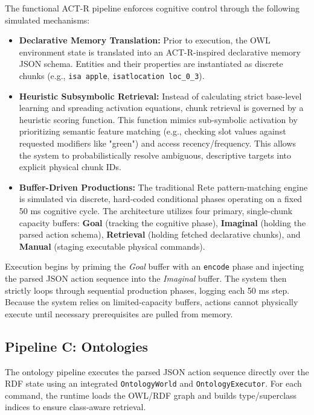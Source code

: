 \documentclass[a4paper]{article}
\begin{document}
The functional ACT-R pipeline enforces cognitive control through the following simulated mechanisms:
\begin{itemize}
    \item \textbf{Declarative Memory Translation:} Prior to execution, the OWL environment state is translated into an ACT-R-inspired declarative memory JSON schema. Entities and their properties are instantiated as discrete chunks (e.g., \texttt{isa apple}, \texttt{isatlocation loc\_0\_3}).
    \item \textbf{Heuristic Subsymbolic Retrieval:} Instead of calculating strict base-level learning and spreading activation equations, chunk retrieval is governed by a heuristic scoring function. This function mimics sub-symbolic activation by prioritizing semantic feature matching (e.g., checking slot values against requested modifiers like "green") and access recency/frequency. This allows the system to probabilistically resolve ambiguous, descriptive targets into explicit physical chunk IDs.
    \item \textbf{Buffer-Driven Productions:} The traditional Rete pattern-matching engine is simulated via discrete, hard-coded conditional phases operating on a fixed 50 ms cognitive cycle. The architecture utilizes four primary, single-chunk capacity buffers: \textbf{Goal} (tracking the cognitive phase), \textbf{Imaginal} (holding the parsed action schema), \textbf{Retrieval} (holding fetched declarative chunks), and \textbf{Manual} (staging executable physical commands).
\end{itemize}

Execution begins by priming the \textit{Goal} buffer with an \texttt{encode} phase and injecting the parsed JSON action sequence into the \textit{Imaginal} buffer. The system then strictly loops through sequential production phases, logging each 50 ms step. Because the system relies on limited-capacity buffers, actions cannot physically execute until necessary prerequisites are pulled from memory.

\subsection{Pipeline C: Ontologies}

The ontology pipeline executes the parsed JSON action sequence directly over the RDF state using an integrated \texttt{OntologyWorld} and \texttt{OntologyExecutor}. For each command, the runtime loads the OWL/RDF graph and builds type/superclass indices to ensure class-aware retrieval.
\end{document}
